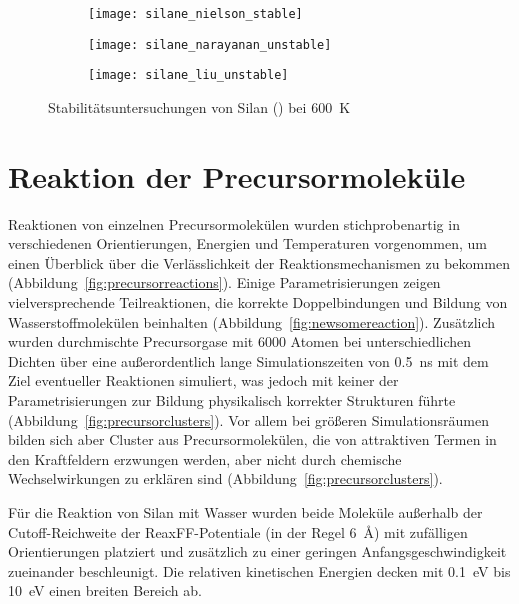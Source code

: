 \begin{figure}[b!h]

  \captionsetup[subfigure]{singlelinecheck=false}
  \def\subfigwidth{0.32\textwidth}
  \begin{subfigure}[t]{3.5cm}
    \texttt{[image: silane\_nielson\_stable]}
  \end{subfigure}
  \hfill
  \begin{subfigure}[t]{4.5cm}
    \texttt{[image: silane\_narayanan\_unstable]}
  \end{subfigure}
  \hfill
  \begin{subfigure}[t]{5cm}
    \texttt{[image: silane\_liu\_unstable]}
  \end{subfigure}

  \caption[Stabilitätsuntersuchungen von Silan]{
    Stabilitätsuntersuchungen von Silan () bei \SI{600}{\kelvin}
  }
  \label{fig:silanestability}

\end{figure}

\section{Reaktion der Precursormoleküle}

Reaktionen von einzelnen Precursormolekülen wurden stichprobenartig in verschiedenen Orientierungen, Energien und Temperaturen vorgenommen, um einen Überblick über die Verlässlichkeit der Reaktionsmechanismen zu bekommen (Abbildung~\ref{fig:precursorreactions}).
Einige Parametrisierungen zeigen vielversprechende Teilreaktionen, die korrekte Doppelbindungen und Bildung von Wasserstoffmolekülen beinhalten (Abbildung~\ref{fig:newsomereaction}).
Zusätzlich wurden durchmischte Precursorgase mit \num{6000} Atomen bei unterschiedlichen Dichten über eine außerordentlich lange Simulationszeiten von \SI{0.5}{\nano\second} mit dem Ziel eventueller Reaktionen simuliert, was jedoch mit keiner der Parametrisierungen zur Bildung physikalisch korrekter Strukturen führte (Abbildung~\ref{fig:precursorclusters}).
Vor allem bei größeren Simulationsräumen bilden sich aber Cluster aus Precursormolekülen, die von attraktiven Termen in den Kraftfeldern erzwungen werden, aber nicht durch chemische Wechselwirkungen zu erklären sind (Abbildung~\ref{fig:precursorclusters}).

Für die Reaktion von Silan mit Wasser wurden beide Moleküle außerhalb der Cutoff-Reich\-weite der ReaxFF-Potentiale (in der Regel \SI{6}{\angstrom}) mit zufälligen Orientierungen platziert und zusätzlich zu einer geringen Anfangsgeschwindigkeit zueinander beschleunigt.
Die relativen kinetischen Energien decken mit \SI{0.1}{\electronvolt} bis \SI{10}{\electronvolt}  einen breiten Bereich ab.


